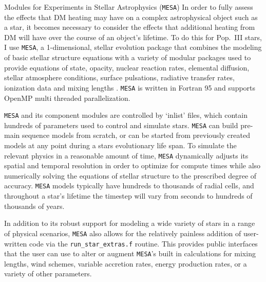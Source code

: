 \documentclass[a4paper,11pt]{article}
\begin{document}
\begin{section}{Modules for Experiments in Stellar Astrophysics (\texttt{MESA})}
    In order to fully assess the effects that DM heating may have on a complex astrophysical object such as a star, it becomes necessary to consider the effects that additional heating from DM will have over the course of an object's lifetime.
    To do this for Pop.~III stars, I use \texttt{MESA}, a 1-dimensional, stellar evolution package that combines the modeling of basic stellar structure equations with a variety of modular packages used to provide equations of state, opacity, nuclear reaction rates, elemental diffusion, stellar atmosphere conditions, surface pulsations, radiative transfer rates, ionization data and mixing lengths \cite{MESA:2011} \cite{MESA:2019}.
    \texttt{MESA} is written in Fortran 95 and supports OpenMP multi threaded parallelization.

    \texttt{MESA} and its component modules are controlled by `inlist' files, which contain hundreds of parameters used to control and simulate stars.
    \texttt{MESA} can build pre-main sequence models from scratch, or can be started from previously created models at any point during a stars evolutionary life span.
    To simulate the relevant physics in a reasonable amount of time, \texttt{MESA} dynamically adjusts its spatial and temporal resolution in order to optimize for compute times while also numerically solving the equations of stellar structure to the prescribed degree of accuracy.
    \texttt{MESA} models typically have hundreds to thousands of radial cells, and throughout a star's lifetime the timestep will vary from seconds to hundreds of thousands of years.

    In addition to its robust support for modeling a wide variety of stars in a range of physical scenarios, \texttt{MESA} also allows for the relatively painless addition of user-written code via the \texttt{run\_star\_extras.f} routine.
    This provides public interfaces that the user can use to alter or augment \texttt{MESA}'s built in calculations for mixing lengths, wind schemes, variable accretion rates, energy production rates, or a variety of other parameters.


\end{section}
\end{document}
